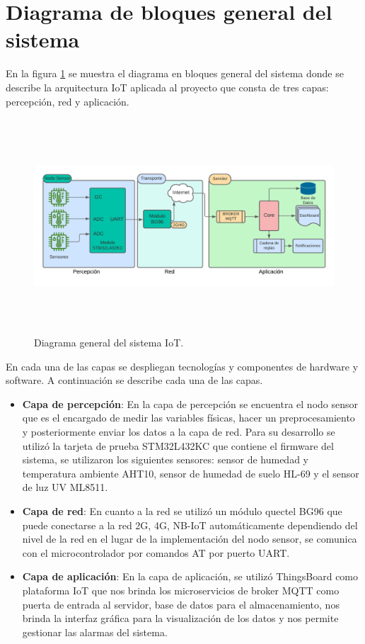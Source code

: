 \section{Diagrama de bloques general del sistema}

En la figura \ref{fig:Diagrama general del sistema IoT} se muestra el diagrama en bloques general del sistema donde se describe la arquitectura IoT aplicada al proyecto que consta de tres capas: percepción, red y aplicación.

\begin{figure}[h]
	\includegraphics[width=\textwidth, height=8cm]{./Figures/DiagramaDelSistema.png}
	\caption{Diagrama general del sistema IoT.}
	\label{fig:Diagrama general del sistema IoT}
\end{figure}

En cada una de las capas se despliegan tecnologías y componentes de hardware y software. A continuación se describe cada una de las capas.

\begin{itemize}
	\item \textbf{Capa de percepción}: En la capa de percepción se encuentra el nodo sensor que es el encargado de medir las variables físicas, hacer un preprocesamiento y posteriormente enviar los datos a la capa de red. Para su desarrollo se utilizó la tarjeta de prueba STM32L432KC que contiene el firmware del sistema, se utilizaron los siguientes sensores: sensor de humedad y temperatura ambiente AHT10, sensor de humedad de suelo HL-69 y el sensor de luz UV ML8511.
  \item \textbf{Capa de red}: En cuanto a la red se utilizó un módulo quectel BG96 que puede conectarse a la red 2G, 4G, NB-IoT automáticamente dependiendo del nivel de la red en el lugar de la implementación del nodo sensor, se comunica con el microcontrolador por comandos AT por puerto UART.
  \item \textbf{Capa de aplicación}: En la capa de aplicación, se utilizó ThingsBoard como plataforma IoT que nos brinda los microservicios de broker MQTT como puerta de entrada al servidor, base de datos para el almacenamiento, nos brinda la interfaz gráfica para la visualización de los datos y nos permite gestionar las alarmas del sistema.

\end{itemize}


